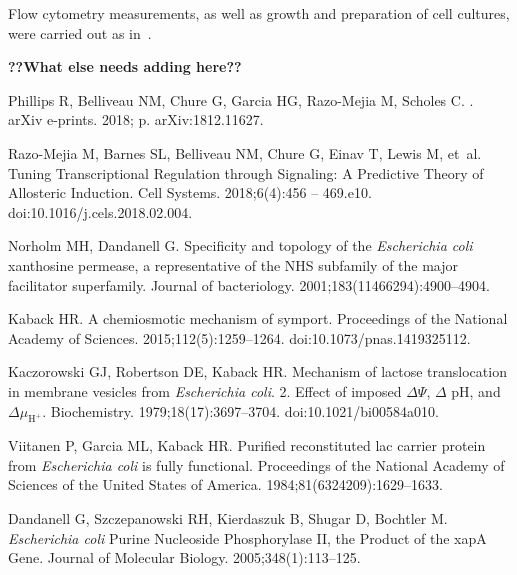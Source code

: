 \documentclass[10pt,letterpaper]{article}
\begin{document}
Flow cytometry measurements, as well as growth and preparation of cell
cultures, were carried out as in~\cite{RazoMejia2018}.

\textbf{??What else needs adding here??}

\FloatBarrier
\newpage

\begin{thebibliography}{10}
	
	{Phillips} R, {Belliveau} NM, {Chure} G, {Garcia} HG, {Razo-Mejia} M, {Scholes}
	C.
	.
	\newblock arXiv e-prints. 2018; p. arXiv:1812.11627.
	
	Razo-Mejia M, Barnes SL, Belliveau NM, Chure G, Einav T, Lewis M, et~al.
	\newblock Tuning Transcriptional Regulation through Signaling: A Predictive
	Theory of Allosteric Induction.
	\newblock Cell Systems. 2018;6(4):456 -- 469.e10.
	\newblock doi:{10.1016/j.cels.2018.02.004}.
	
	Norholm MH, Dandanell G.
	\newblock Specificity and topology of the \emph{Escherichia coli} xanthosine
	permease, a representative of the NHS subfamily of the major facilitator
	superfamily.
	\newblock Journal of bacteriology. 2001;183(11466294):4900--4904.
	
	Kaback HR.
	\newblock A chemiosmotic mechanism of symport.
	\newblock Proceedings of the National Academy of Sciences.
	2015;112(5):1259--1264.
	\newblock doi:{10.1073/pnas.1419325112}.
	
	Kaczorowski GJ, Robertson DE, Kaback HR.
	\newblock Mechanism of lactose translocation in membrane vesicles from
	\emph{Escherichia coli}. 2. Effect of imposed $\Delta \Psi$, $\Delta$ pH, and
	$\Delta \mu_{\mathrm{H^+}}$.
	\newblock Biochemistry. 1979;18(17):3697--3704.
	\newblock doi:{10.1021/bi00584a010}.
	
	Viitanen P, Garcia ML, Kaback HR.
	\newblock Purified reconstituted lac carrier protein from \emph{Escherichia
		coli} is fully functional.
	\newblock Proceedings of the National Academy of Sciences of the United States
	of America. 1984;81(6324209):1629--1633.
	
	Dandanell G, Szczepanowski RH, Kierdaszuk B, Shugar D, Bochtler M.
	\newblock \emph{Escherichia coli} Purine Nucleoside Phosphorylase II, the
	Product of the xapA Gene.
	\newblock Journal of Molecular Biology. 2005;348(1):113--125.
	

\end{thebibliography}
\end{document}
